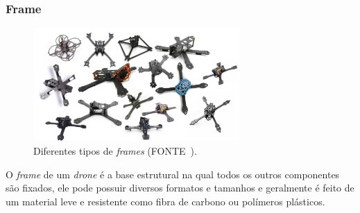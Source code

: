 \documentclass[12pt,a4paper,oneside]{book}
\begin{document}
\newpage

\subsubsection*{Frame}
\begin{figure}[H]
  \centering
  \includegraphics[width=0.7\textwidth]{Images/introducao/different_frames.jpg}
  \caption{Diferentes tipos de \textit{frames} (FONTE~\cite{url:esc_pwm}).}
  \label{fig:different_frames.jpg.0}
\end{figure}
%
O \textit{frame} de um \textit{drone} é a base estrutural na qual todos os outros componentes são fixados, ele pode possuir diversos formatos e tamanhos e geralmente é feito de um material leve e resistente como fibra de carbono ou polímeros plásticos. 
\end{document}
